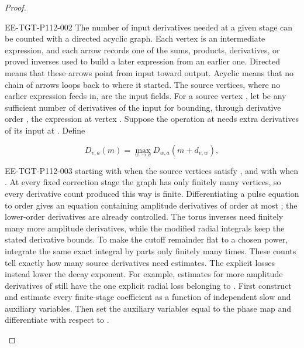 \begin{proof}
\begin{EESegment}{EE-TGT-P112-002}
The number of input derivatives needed at a given stage can be counted with a directed acyclic
graph. Each vertex is an intermediate expression, and each arrow records one of the sums,
products, derivatives, or proved inverses used to build a later expression from an earlier one.
Directed means that these arrows point from input toward output. Acyclic means that no chain of
arrows loops back to where it started. The source vertices, where no earlier expression feeds in,
are the input fields. For a source vertex , let
 be any sufficient number of derivatives of the input
 for bounding, through derivative order
, the expression at vertex . Suppose the operation
at  needs  extra derivatives of its input at
. Define
\end{EESegment}
\[
D_{v,a}(m)=\max_{w\to v}D_{w,a}(m+d_{v,w}),
\]
\begin{EESegment}{EE-TGT-P112-003}
starting with  when the source vertices satisfy
, and with  when
. At every fixed correction stage the graph has only finitely many
vertices, so every derivative count produced this way is finite. Differentiating a pulse equation
to order  gives an equation containing amplitude derivatives of order at
most ; the lower-order derivatives are already controlled. The torus
inverses need finitely many more amplitude derivatives, while the modified radial integrals keep
the stated derivative bounds. To make the cutoff remainder flat to a chosen power, integrate the
same exact integral by parts only finitely many times. These counts tell exactly how many source
derivatives need estimates. The explicit  losses instead lower
the decay exponent. For example, estimates for more amplitude derivatives of
 still have the one explicit radial loss belonging to
. First construct and estimate every finite-stage coefficient as a
function of independent slow and auxiliary variables. Then set the auxiliary variables equal to
the phase map  and differentiate with respect to
.
\end{EESegment}
\end{proof}

